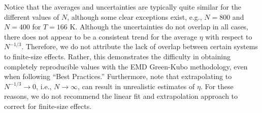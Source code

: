 \documentclass[preprint,review,12pt]{elsarticle}
\begin{document}
	Notice that the averages and uncertainties are typically quite similar for the different values of $N$, although some clear exceptions exist, e.g., $N = 800$ and $N=400$ for $T = 166$ K. Although the uncertainties do not overlap in all cases, there does not appear to be a consistent trend for the average $\eta$ with respect to $N^{-1/3}$. Therefore, we do not attribute the lack of overlap between certain systems to finite-size effects. Rather, this demonstrates the difficulty in obtaining completely reproducible values with the EMD Green-Kubo methodology, even when following ``Best Practices.'' Furthermore, note that extrapolating to $N^{-1/3} \rightarrow 0$, i.e., $N \rightarrow \infty$, can result in unrealistic estimates of $\eta$. For these reasons, we do not recommend the linear fit and extrapolation approach to correct for finite-size effects.
	
	
	
	
	
\end{document}
